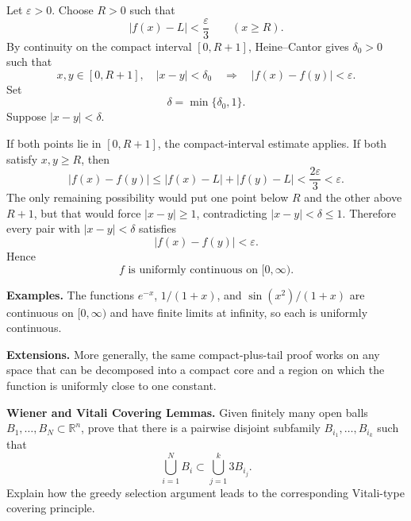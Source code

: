 \begin{solution}
Let \(\varepsilon>0\). Choose \(R>0\) such that
\[
|f(x)-L|<\frac{\varepsilon}{3}
\qquad(x\ge R).
\]
By continuity on the compact interval \([0,R+1]\), Heine--Cantor gives
\(\delta_0>0\) such that
\[
x,y\in[0,R+1],\quad |x-y|<\delta_0
\quad\Longrightarrow\quad
|f(x)-f(y)|<\varepsilon.
\]
Set
\[
\delta=\min\{\delta_0,1\}.
\]
Suppose \(|x-y|<\delta\).

If both points lie in \([0,R+1]\), the compact-interval estimate applies.
If both satisfy \(x,y\ge R\), then
\[
|f(x)-f(y)|
\le
|f(x)-L|+|f(y)-L|
<\frac{2\varepsilon}{3}<\varepsilon.
\]
The only remaining possibility would put one point below \(R\) and the other
above \(R+1\), but that would force \(|x-y|\ge1\), contradicting
\(|x-y|<\delta\le1\). Therefore every pair with \(|x-y|<\delta\) satisfies
\[
|f(x)-f(y)|<\varepsilon.
\]
Hence
\[
\boxed{f\text{ is uniformly continuous on }[0,\infty).}
\]

\medskip
\noindent\textbf{Examples.}
The functions \(e^{-x}\), \(1/(1+x)\), and
\(\sin(x^2)/(1+x)\) are continuous on \([0,\infty)\) and have finite limits
at infinity, so each is uniformly continuous.

\medskip
\noindent\textbf{Extensions.}
More generally, the same compact-plus-tail proof works on any space that can
be decomposed into a compact core and a region on which the function is
uniformly close to one constant.
\end{solution}


\begin{problem}[CP-II-0530]
\label{prob:cp-ii-0530}
\textbf{Wiener and Vitali Covering Lemmas.}
Given finitely many open balls \(B_1,\dots,B_N\subset\mathbb R^n\), prove that
there is a pairwise disjoint subfamily \(B_{i_1},\dots,B_{i_k}\) such that
\[
\bigcup_{i=1}^N B_i\subset\bigcup_{j=1}^k 3B_{i_j}.
\]
Explain how the greedy selection argument leads to the corresponding
Vitali-type covering principle.
\end{problem}


